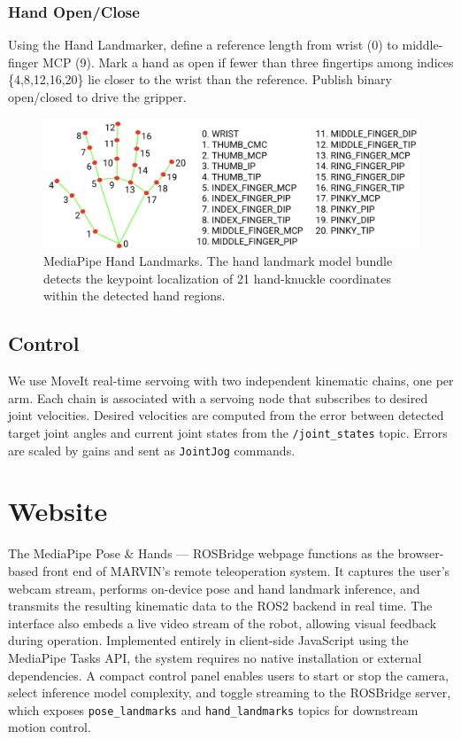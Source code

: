 \documentclass[sigconf]{acmart}
\begin{document}
\subsubsection{Hand Open/Close}
Using the Hand Landmarker, define a reference length from wrist (0) to middle-finger MCP (9). Mark a hand as open if fewer than three fingertips among indices \{4,8,12,16,20\} lie closer to the wrist than the reference. Publish binary open/closed to drive the gripper.

\begin{figure}[htbp]
  \centering
  \includegraphics[width=\linewidth]{assets/hand-landmarks.png}
  \caption{MediaPipe Hand Landmarks. The hand landmark model bundle detects the keypoint localization of 21 hand-knuckle coordinates within the detected hand regions.}
  \label{fig:hand-landmarks}
\end{figure}

\subsection{Control}
We use MoveIt real-time servoing with two independent kinematic chains, one per arm. Each chain is associated with a servoing node that subscribes to desired joint velocities. Desired velocities are computed from the error between detected target joint angles and current joint states from the \texttt{/joint\_states} topic. Errors are scaled by gains and sent as \texttt{JointJog} commands.

\section{Website}
The MediaPipe Pose \& Hands — ROSBridge webpage functions as the browser-based front end of MARVIN’s remote teleoperation system. It captures the user’s webcam stream, performs on-device pose and hand landmark inference, and transmits the resulting kinematic data to the ROS2 backend in real time. The interface also embeds a live video stream of the robot, allowing visual feedback during operation. Implemented entirely in client-side JavaScript using the MediaPipe Tasks API, the system requires no native installation or external dependencies. A compact control panel enables users to start or stop the camera, select inference model complexity, and toggle streaming to the ROSBridge server, which exposes \texttt{pose\_landmarks} and \texttt{hand\_landmarks} topics for downstream motion control.
\end{document}
